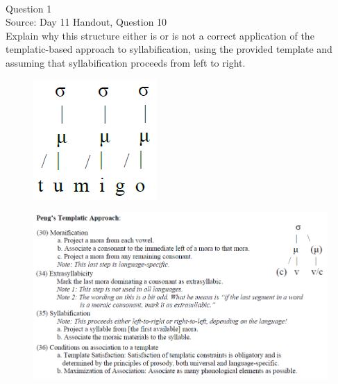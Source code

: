 \documentclass[12pt]{article}
\begin{document}
\newpage

\begin{center}
\textbf{{\color{red}{\HUGE END OF EXAM}}}\\

\end{center}
\newpage

\begin{center}
\textbf{{\color{blue}{\HUGE START OF EXAM\\}}}

\textbf{{\color{blue}{\HUGE Student ID: 4656\\}}}

\textbf{{\color{blue}{\HUGE 12:30 - 12:50 PM\\}}}

\end{center}
\newpage

{\large Question 1}\\

Source: Day 11 Handout, Question 10\\

Explain why this structure either is or is not a correct application of the templatic-based approach to syllabification, using the provided template and assuming that syllabification proceeds from left to right.\\

\begin{figure}[H]
\includegraphics{../images/pengtemplate_tumigo_yes.png}
\end{figure}
\begin{figure}[H]
\includegraphics{../images/peng_template_withdiagram.png}
\end{figure}
\end{document}
